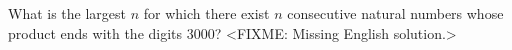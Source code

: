 \problem
What is the largest $n$ for which there exist $n$ consecutive natural numbers
whose product ends with the digits $3000$?
\solution
<FIXME: Missing English solution.>
\endproblem
